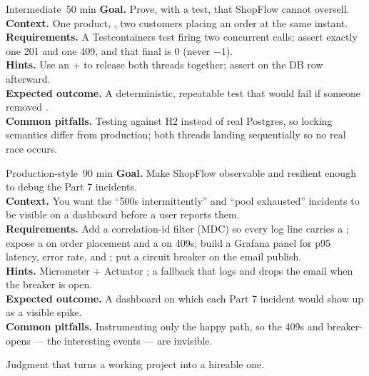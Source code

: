 \begin{minilab}{Intermediate}{~50 min}
\textbf{Goal.} Prove, with a test, that ShopFlow cannot oversell.\\
\textbf{Context.} One product, , two customers placing an order at the same instant.\\
\textbf{Requirements.} A Testcontainers test firing two concurrent  calls; assert exactly one 201 and one 409, and that final  is 0 (never $-1$).\\
\textbf{Hints.} Use an  +  to release both threads together; assert on the DB row afterward.\\
\textbf{Expected outcome.} A deterministic, repeatable test that would fail if someone removed .\\
\textbf{Common pitfalls.} Testing against H2 instead of real Postgres, so locking semantics differ from production; both threads landing sequentially so no real race occurs.
\end{minilab}

\begin{minilab}{Production-style}{~90 min}
\textbf{Goal.} Make ShopFlow observable and resilient enough to debug the Part 7 incidents.\\
\textbf{Context.} You want the ``500s intermittently'' and ``pool exhausted'' incidents to be visible on a dashboard before a user reports them.\\
\textbf{Requirements.} Add a correlation-id filter (MDC) so every log line carries a ; expose a  on order placement and a  on 409s; build a Grafana panel for p95 latency, error rate, and ; put a circuit breaker on the email publish.\\
\textbf{Hints.} Micrometer  + Actuator ; a fallback that logs and drops the email when the breaker is open.\\
\textbf{Expected outcome.} A dashboard on which each Part 7 incident would show up as a visible spike.\\
\textbf{Common pitfalls.} Instrumenting only the happy path, so the 409s and breaker-opens --- the interesting events --- are invisible.
\end{minilab}


Judgment that turns a working project into a hireable one.

